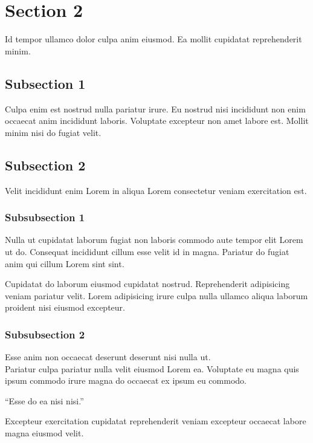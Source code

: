 \documentclass
    [   %
        repeatauthor,           %
        shorttitle,             %
        a4paper                 %
    ]{uhhassignment}
\begin{document}
\section{Section 2}
Id tempor ullamco dolor culpa anim eiusmod. Ea mollit cupidatat reprehenderit minim.

\subsection{Subsection 1}
\label{subsec: Subsection1}
Culpa enim est nostrud nulla pariatur irure. Eu nostrud nisi incididunt non enim occaecat anim incididunt laboris. 
Voluptate excepteur non amet labore est. Mollit minim nisi do fugiat velit.

\subsection{Subsection 2}
Velit incididunt enim Lorem in aliqua Lorem consectetur veniam exercitation est.

\subsubsection{Subsubsection 1}
Nulla ut cupidatat laborum fugiat non laboris commodo aute tempor elit Lorem ut do. 
Consequat incididunt cillum esse velit id in magna. Pariatur do fugiat anim qui cillum Lorem sint sint. 

Cupidatat do laborum eiusmod cupidatat nostrud. Reprehenderit adipisicing veniam pariatur velit. 
Lorem adipisicing irure culpa nulla ullamco aliqua laborum proident nisi eiusmod excepteur.

\subsubsection{Subsubsection 2}
Esse anim non occaecat deserunt deserunt nisi nulla ut.\\
Pariatur culpa pariatur nulla velit eiusmod Lorem ea. 
Voluptate eu magna quis ipsum commodo irure magna do occaecat ex ipsum eu commodo. 

\enquote{Esse do ea nisi nisi.}

Excepteur exercitation cupidatat reprehenderit veniam excepteur occaecat labore magna eiusmod velit.
\end{document}
